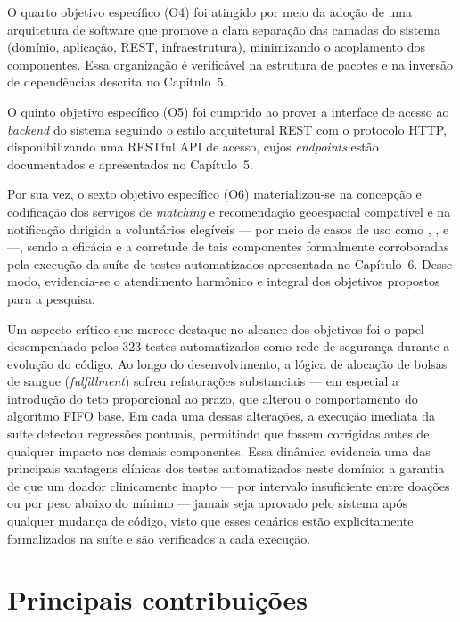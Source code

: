 O quarto objetivo específico (O4) foi atingido por meio da adoção de uma arquitetura de software que promove a clara separação das camadas do sistema (domínio, aplicação, REST, infraestrutura), minimizando o acoplamento dos componentes. Essa organização é verificável na estrutura de pacotes e na inversão de dependências descrita no Capítulo~5.

O quinto objetivo específico (O5) foi cumprido ao prover a interface de acesso ao \textit{backend} do sistema seguindo o estilo arquitetural REST com o protocolo HTTP, disponibilizando uma RESTful API de acesso, cujos \textit{endpoints} estão documentados e apresentados no Capítulo~5.

Por sua vez, o sexto objetivo específico (O6) materializou-se na concepção e codificação dos serviços de \textit{matching} e recomendação geoespacial compatível e na notificação dirigida a voluntários elegíveis --- por meio de casos de uso como , ,  e  ---, sendo a eficácia e a corretude de tais componentes formalmente corroboradas pela execução da suíte de testes automatizados apresentada no Capítulo~6. Desse modo, evidencia-se o atendimento harmônico e integral dos objetivos propostos para a pesquisa.

Um aspecto crítico que merece destaque no alcance dos objetivos foi o papel desempenhado pelos 323 testes automatizados como rede de segurança durante a evolução do código. Ao longo do desenvolvimento, a lógica de alocação de bolsas de sangue (\textit{fulfillment}) sofreu refatorações substanciais --- em especial a introdução do teto proporcional ao prazo, que alterou o comportamento do algoritmo FIFO base. Em cada uma dessas alterações, a execução imediata da suíte detectou regressões pontuais, permitindo que fossem corrigidas antes de qualquer impacto nos demais componentes. Essa dinâmica evidencia uma das principais vantagens clínicas dos testes automatizados neste domínio: a garantia de que um doador clinicamente inapto --- por intervalo insuficiente entre doações ou por peso abaixo do mínimo --- jamais seja aprovado pelo sistema após qualquer mudança de código, visto que esses cenários estão explicitamente formalizados na suíte e são verificados a cada execução.

\section{Principais contribuições}

